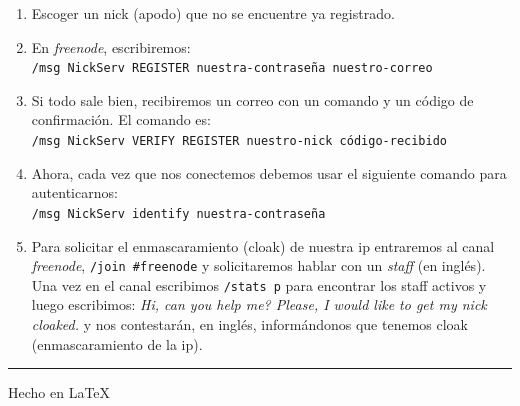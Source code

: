 \documentclass[12pt,letterpaper]{article}
\begin{document}
\begin{enumerate}

\item Escoger un nick (apodo) que no se encuentre ya registrado.

\item En \textsl{freenode}, escribiremos:\\
\verb!/msg NickServ REGISTER nuestra-contraseña nuestro-correo!

\item Si todo sale bien, recibiremos un correo con un comando y un c\'odigo de confirmaci\'on. El comando es:\\
\verb!/msg NickServ VERIFY REGISTER nuestro-nick código-recibido!

\item Ahora, cada vez que nos conectemos debemos usar el siguiente comando para autenticarnos: \\
\verb!/msg NickServ identify nuestra-contraseña!
    
\item Para solicitar el enmascaramiento (cloak) de nuestra ip entraremos al canal \textsl{freenode}, \texttt{/join \#freenode} y solicitaremos hablar con un \textit{staff} (en inglés). Una vez en el canal escribimos \texttt{/stats p} para encontrar los staff activos y luego escribimos: \textit{ Hi, can you help me? Please, I would like to get my nick cloaked.}  y nos contestar\'an, en ingl\'es, inform\'andonos que tenemos cloak (enmascaramiento de la ip).

\end{enumerate}













\noindent\rule{\textwidth}{1pt}
Hecho en \LaTeX

\theendnotes
\end{document}
